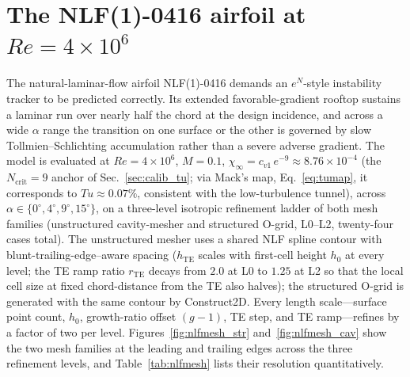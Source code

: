 \documentclass[journal]{new-aiaa}
\begin{document}
\section{The NLF(1)-0416 airfoil at $Re\!=\!4\!\times\!10^6$}\label{sec:nlfval}

The natural-laminar-flow airfoil NLF(1)-0416 demands an $e^N$-style instability
tracker to be predicted correctly. Its extended favorable-gradient rooftop
sustains a laminar run over nearly half the chord at the design incidence, and
across a wide $\alpha$ range the transition on one surface or the other is
governed by slow Tollmien--Schlichting accumulation rather than a severe adverse
gradient. The model is evaluated at $Re\!=\!4\!\times\!10^6$, $M\!=\!0.1$,
$\chi_\infty\!=\!c_{v1}\,e^{-9}\!\approx\!8.76\!\times\!10^{-4}$
(the $N_\mathrm{crit}\!=\!9$ anchor of Sec.~\ref{sec:calib_tu}; via Mack's
map, Eq.~\eqref{eq:tumap}, it corresponds to $Tu\!\approx\!0.07\%$, consistent
with the low-turbulence tunnel), across
$\alpha\!\in\!\{0^\circ, 4^\circ, 9^\circ,
15^\circ\}$, on a three-level isotropic refinement ladder of both mesh families
(unstructured cavity-mesher and structured O-grid, L0--L2, twenty-four
cases total). The unstructured mesher uses a shared NLF spline contour with
blunt-trailing-edge--aware spacing ($h_\mathrm{TE}$ scales with first-cell
height $h_0$ at every level; the TE ramp ratio $r_\mathrm{TE}$ decays from
$2.0$ at L0 to $1.25$ at L2 so that the local cell size at fixed chord-distance
from the TE also halves); the structured O-grid is generated with the same
contour by Construct2D. Every length scale---surface point count, $h_0$,
growth-ratio offset $(g-1)$, TE step, and TE ramp---refines by a factor of two
per level.
Figures~\ref{fig:nlfmesh_str} and~\ref{fig:nlfmesh_cav} show the two mesh
families at the leading and trailing edges across the three refinement levels,
and Table~\ref{tab:nlfmesh} lists their resolution quantitatively.
\end{document}
